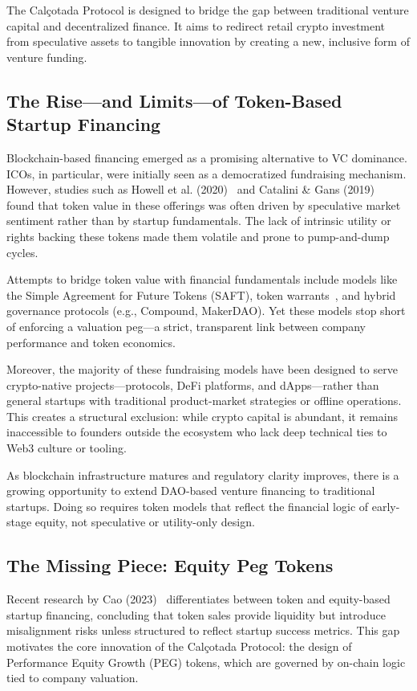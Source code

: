 \documentclass[conference]{IEEEtran}
\begin{document}
The Calçotada Protocol is designed to bridge the gap between traditional venture capital and decentralized finance. It aims to redirect retail crypto investment from speculative assets to tangible innovation by creating a new, inclusive form of venture funding.

\subsection{The Rise—and Limits—of Token-Based Startup Financing}
Blockchain-based financing emerged as a promising alternative to VC dominance. ICOs, in particular, were initially seen as a democratized fundraising mechanism. However, studies such as Howell et al. (2020)~\cite{howell2020initial} and Catalini \& Gans (2019)~\cite{catalini2019some} found that token value in these offerings was often driven by speculative market sentiment rather than by startup fundamentals. The lack of intrinsic utility or rights backing these tokens made them volatile and prone to pump-and-dump cycles.

Attempts to bridge token value with financial fundamentals include models like the Simple Agreement for Future Tokens (SAFT), token warrants~\cite{lw2019token}, and hybrid governance protocols (e.g., Compound, MakerDAO). Yet these models stop short of enforcing a valuation peg—a strict, transparent link between company performance and token economics.

Moreover, the majority of these fundraising models have been designed to serve crypto-native projects—protocols, DeFi platforms, and dApps—rather than general startups with traditional product-market strategies or offline operations. This creates a structural exclusion: while crypto capital is abundant, it remains inaccessible to founders outside the ecosystem who lack deep technical ties to Web3 culture or tooling.

As blockchain infrastructure matures and regulatory clarity improves, there is a growing opportunity to extend DAO-based venture financing to traditional startups. Doing so requires token models that reflect the financial logic of early-stage equity, not speculative or utility-only design.

\subsection{The Missing Piece: Equity Peg Tokens}

Recent research by Cao (2023)~\cite{cao2023token} differentiates between token and equity-based startup financing, concluding that token sales provide liquidity but introduce misalignment risks unless structured to reflect startup success metrics. This gap motivates the core innovation of the Calçotada Protocol: the design of Performance Equity Growth (PEG) tokens, which are governed by on-chain logic tied to company valuation.
\end{document}

